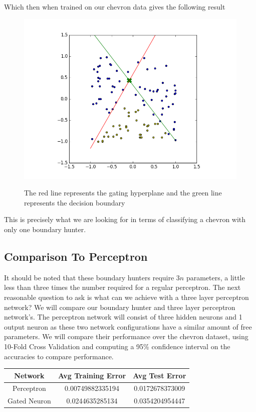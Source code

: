 \documentclass[notitlepage]{report}
\theoremstyle{definition}
\begin{document}
Which then when trained on our chevron data gives the following result

\begin{figure}[H]
  \centering
  \begin{minipage}[b]{0.4\textwidth}
    \includegraphics[width=\textwidth]{GN-MH-01.png}
    \caption{}
  \end{minipage}
  \hfill

The red line represents the gating hyperplane and the green line represents the decision boundary
\end{figure}

This is precisely what we are looking for in terms of classifying a chevron with only one boundary hunter.

\subsection{Comparison To Perceptron}
It should be noted that these boundary hunters require $3n$ parameters, a little less than three times the number required for a regular perceptron. The next reasonable question to ask is what can we achieve with a three layer perceptron network? We will compare our boundary hunter and three layer perceptron network's. The perceptron network will consist of three hidden neurons and 1 output neuron as these two network configurations have a similar amount of free parameters. We will compare their performance over the chevron dataset, using 10-Fold Cross Validation and computing a 95\% confidence interval on the accuracies to compare performance.

\begin{center}
\begin{tabular}{| c | c | c |}
\hline
Network & Avg Training Error & Avg Test Error \\
\hline
\hline
Perceptron & 0.00749882335194 & 0.0172678373009 \\
\hline
Gated Neuron & 0.0244635285134 & 0.0354204954447 \\
\hline
\end{tabular}
\end{center}
\end{document}
